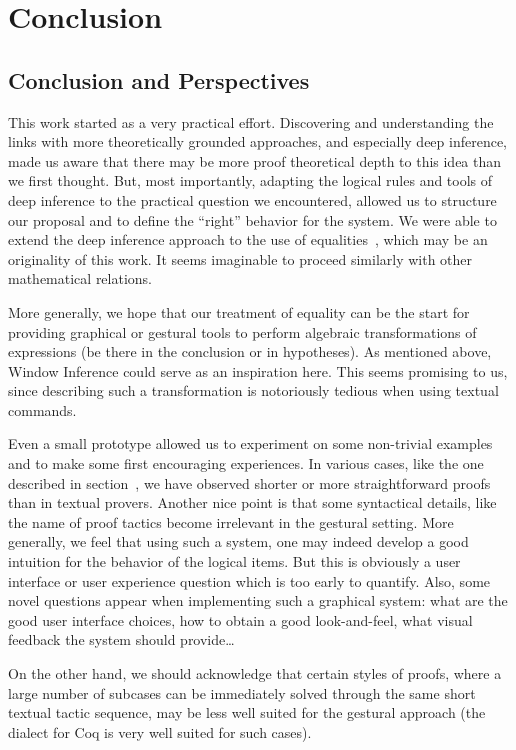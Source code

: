 \setchapterpreamble[u]{\margintoc}
\chapter{Conclusion}

\section{Conclusion and Perspectives}

This work started as a very practical effort. Discovering and
understanding the links with more theoretically grounded approaches,
and especially deep inference, made us aware that there may be more
proof theoretical depth to this idea than we first thought. But, most
importantly, adapting the logical rules and tools of deep inference to
the practical question we encountered, allowed us to structure our
proposal and to define the ``right'' behavior for the system. We were
able to extend the deep inference approach to the use of
equalities~, which may be an originality of this
work. It seems imaginable to proceed similarly with other mathematical
relations. 

More generally, we hope that our treatment of equality can be the
start for providing graphical or gestural tools to perform algebraic
transformations of expressions (be there in the conclusion or in
hypotheses). As mentioned above, Window Inference could serve as an
inspiration here. This seems promising to us, since describing such a
transformation is notoriously tedious when using textual commands.

Even a small prototype allowed us to experiment on some non-trivial
examples and to make some first encouraging experiences. In various
cases, like the one described in section~, we have
observed shorter or more straightforward proofs than in textual
provers. Another nice point is that some syntactical details, like the
name of proof tactics become irrelevant in the gestural setting. More
generally, we feel that using such a system, one may indeed develop a
good intuition for the behavior of the logical items. But this is
obviously a user interface or user experience question which is too
early to quantify. Also, some novel questions appear when implementing
such a graphical system: what are the good user interface choices, how
to obtain a good look-and-feel, what visual feedback the system should
provide\dots

On the other hand, we should acknowledge that certain styles of proofs,
where a large number of subcases can be immediately solved through the
same short textual tactic sequence, may be less well suited for the
gestural approach (the \ssreflect~\cite{SSR} dialect for Coq is very
well suited for such cases).


